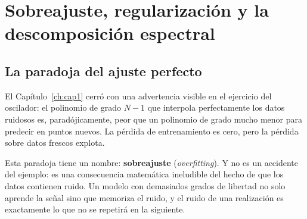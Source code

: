 
\chapter{Sobreajuste, regularización y la descomposición espectral}
\label{ch:cap2}

\section{La paradoja del ajuste perfecto}
\label{sec:paradoja}


El Capítulo~\ref{ch:cap1} cerró con una advertencia visible en el
ejercicio del oscilador: el polinomio de grado $N-1$ que interpola
perfectamente los datos ruidosos es, paradójicamente, peor que un
polinomio de grado mucho menor para predecir en puntos nuevos. La
pérdida de entrenamiento es cero, pero la pérdida sobre datos frescos
explota.

Esta paradoja tiene un nombre: \textbf{sobreajuste}
(\textit{overfitting}). Y no es un accidente del ejemplo: es una
consecuencia matemática ineludible del hecho de que los datos contienen
ruido. Un modelo con demasiados grados de libertad no solo aprende la
señal sino que memoriza el ruido, y el ruido de una realización es
exactamente lo que no se repetirá en la siguiente.


